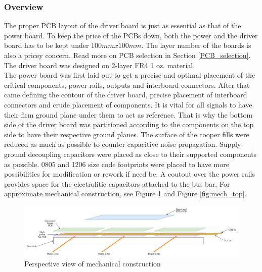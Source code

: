 \subsubsection{Overview}

The proper PCB layout of the driver board is just as essential as that of the power board. To keep the price of the PCBs down, both the power and the driver board has to be kept under $100mm x 100mm$. The layer number of the boards is also a pricey concern. Read more on PCB selection in Section \ref{PCB_selection}. The driver board was designed on 2-layer FR4 1 oz. material. \\

The power board was first laid out to get a precise and optimal placement of the critical components, power rails, outputs and interboard connectors. After that came defining the contour of the driver board, precise placement of interboard connectors and crude placement of components. It is vital for all signals to have their firm ground plane under them to act as reference. That is why the bottom side of the driver board was partitioned according to the components on the top side to have their respective ground planes. The surface of the cooper fills were reduced as much as possible to counter capacitive noise propagation. Supply-ground decoupling capacitors were placed as close to their supported components as possible. 0805 and 1206 size code footprints were placed to have more possibilities for modification or rework if need be. A coutout over the power rails provides space for the electrolitic capacitors attached to the bus bar. For approximate mechanical construction, see Figure \ref{fig:mech_persp} and Figure \ref{fig:mech_top}.

\begin{figure}[H]
	\centering
	\includegraphics[width=1\textwidth]{pictures/hardware/Power_Board/mechanical_persp_new.png}
	\caption{Perspective view of mechanical construction}
	\label{fig:mech_persp}
\end{figure}

